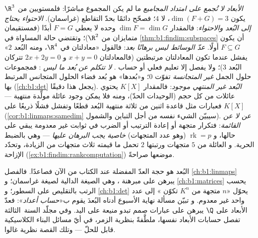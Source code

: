 \begin{remark}
\label{rem:b1:findim:pitfalls}
\emph{الأبعاد لا تُجمع على امتداد المجاميع} ما لم يكن المجموع مباشرًا:
فلمستويين من $\R^3$ يكون $\dim(F + G) = 3$، لا $4$؛ فصحّح
دائمًا بحدّ التقاطع (غراسمان).
\emph{الاحتواء يحتاج إلى البُعد \emph{و}الاحتواء}:
فالمقدار $\dim F = \dim G$ وحده لا يعطي $F = G$ أبدًا (فمستقيمان متمايزان
من $\R^2$)؛ وتقتضي حالة المساواة في
\cref{thm:b1:findim:subspaces} أن يكون $F \subseteq G$ أولًا.
\emph{عدّ الوسائط ليس برهانًا بعد}: فالقول «معادلتان في
$\R^4$، ومنه البُعد $2$» يفشل عندما تكون المعادلتان
مرتبطتين (فالمعادلتان $x + y = 0$ و $2x + 2y = 0$ تتركان البُعد $3$)؛
ولا يفصل إلا تعليم فعلي أو حساب .
\emph{لا تتكلم عن بُعد ما ليس }: فمجموعات
حلول الجمل \emph{غير المتجانسة} تفوّت $0$؛ و«بُعدها»
هو بُعد فضاء الحلول المتجانس المرتبط بها
(\cref{ch:b1:det} يجعل هذا دقيقًا).
\emph{البُعد غير المنتهي موجود}: فالمقدار $K[X]$ يحتوي عائلات 
من كل حجم (الوحيدات الحدّ)، ومنه فلا يمكن وجود عائلة مولِّدة
منتهية --- فعبارات مثل قاعدة اثنين من ثلاثة
منتهية البُعد قطعًا وتفشل فشلًا ذريعًا على $K[X]$
(\cref{cor:b1:linmaps:samedim} سيبيّن الشيء نفسه من أجل
التباين والشمول).
\emph{ عن  لا عن القائمة}: فتكرار متجهة
أو إعادة الترتيب أو الضرب في ثوابت غير معدومة يبقي 
على حالها، و $\operatorname{rk} = p$ (وهو عدد المتجهات)
\emph{خاصية يجب البرهان عليها} --- وهي بالضبط الحرية. و
العائلة من $5$ متجهات ورتبتها $2$ تحمل ما قيمته ثلاث متجهات
من الزيادة، وتحدّد الإزاحة
(\cref{ex:b1:findim:rankcomputation}) موضعها صراحةً.
\end{remark}

\begin{remark}
\label{rem:b1:findim:whereused}
البُعد هو حجة العدّ المفضلة عند الكتاب من الآن فصاعدًا.
فالفصل \cref{ch:b1:linmaps} يبرهن على مبرهنة ، وهي الصيغة
الدالية لصيغة غراسمان؛ و \cref{ch:b1:matrices}
يحسب الرتب بالتقليص على السطور؛ و \cref{ch:b1:det} يحوّل «$n$
متجهة من $K^n$ تكوّن » إلى عدد واحد غير معدوم. و
تبيّن مسألة نهاية الأسبوع أدناه البُعدَ يقوم ب«\emph{حساب أعداد}»:
فعدّ الأبعاد على  $\Q$ يبرهن على عبارات صمم
تبدو منيعة على اليد. وفي مجلّد السنة~الثالثة تفصل
حسابات الأبعاد نفسها، ملطَّفةً بنظرية الزمر، في أيّ مسائل
البناء الكلاسيكية قابل للحلّ --- وتلك القصة نظرية غالوا.
\end{remark}

